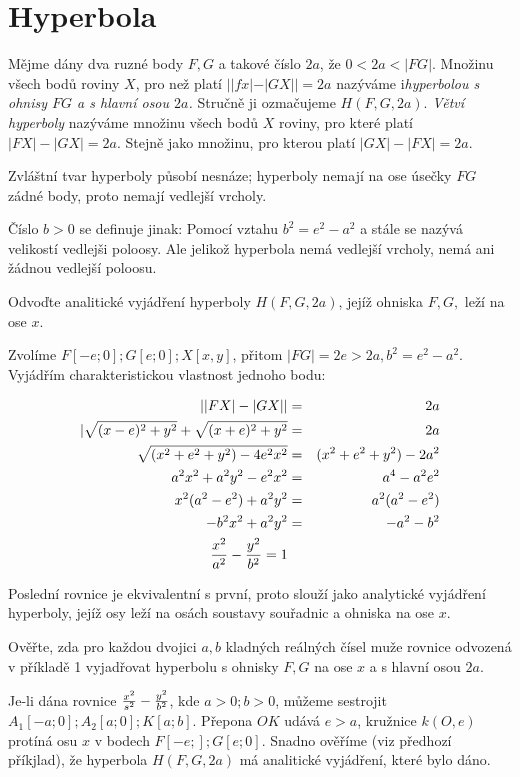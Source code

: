 
\BeginDoc{}
\section{Hyperbola}
\Def Mějme dány dva ruzné body $F,G$ a takové číslo $2a$, že $0<2a<|FG|$.
Množinu všech bodů roviny $X$, pro než platí $||fx|-|GX||=2a$ nazýváme i\emph{hyperbolou s ohnisy $FG$ a s hlavní osou $2a$.}
Stručně ji ozmačujeme $H(F,G,2a)$.
\emph{Větví hyperboly} nazýváme množinu všech bodů $X$ roviny, pro které platí $|FX| - |GX|   = 2a$.
Stejně jako množinu, pro kterou platí $|GX|  - |FX| = 2a$.

\Poz
Zvláštní tvar hyperboly působí nesnáze; hyperboly nemají na ose úsečky $FG$ zádné body, proto nemají vedlejší vrcholy.

Číslo $b>0$ se definuje jinak: Pomocí vztahu $b^2 = e^2 - a^2$ a stále se nazývá velikostí vedlejši poloosy.
Ale jelikož hyperbola nemá vedlejší vrcholy, nemá ani žádnou vedlejší poloosu.

\Pr
Odvoďte analitické vyjádření hyperboly $H(F,G,2a)$, jejíž ohniska $F,G,$ leží na ose $x$.


Zvolíme $F[-e;0];G[e;0];X[x,y]$, přitom $|FG| = 2e > 2a, b^2 = e^2 - a^2$.
Vyjádřím charakteristickou vlastnost jednoho bodu:

\begin{eqnarray*}
	||FX|-|GX|| &=& 2a\\
	|\sqrt{(x-e)^2+y^2}+\sqrt{(x+e)^2+y^2} & = & 2a\\
	\sqrt{(x^2+e^2+y^2) - 4e^2x^2} &=& (x^2+e^2+y^2) - 2a^2\\
	a^2x^2 + a^2 y^2 - e^2x^2 &=& a^4-a^2e^2\\
	x^2(a^2-e^2) + a^2y^2 &=& a^2(a^2-e^2)\\
	-b^2x^2 + a^2y^2  &=& -a^2-b^2\\
	\frac{x^2}{a^2} - \frac{y^2}{b^2} = 1
\end{eqnarray*}

Poslední rovnice je ekvivalentní s první, proto slouží jako analytické vyjádření hyperboly, jejíž osy leží na osách soustavy souřadnic a ohniska na ose $x$.

\Pr
Ověřte, zda pro každou dvojici $a,b$ kladných reálných čísel muže rovnice odvozená v příkladě 1 vyjadřovat hyperbolu s ohnisky $F,G$ na ose $x$ a s hlavní osou $2a$.

Je-li dána rovnice $\frac{x^2}{s^2} - \frac{y^2}{b^2}$, kde $a>0;b>0$, můžeme sestrojit $A_1[-a;0];A_2[a;0];K[a;b]$.
Přepona $OK$ udává $e>a$, kružnice $k(O,e)$ protíná osu $x$ v bodech $F[-e;];G[e;0]$. Snadno ověříme (viz předhozí příkjlad), že hyperbola $H(F,G,2a)$ má analitické vyjádření, které bylo dáno.

